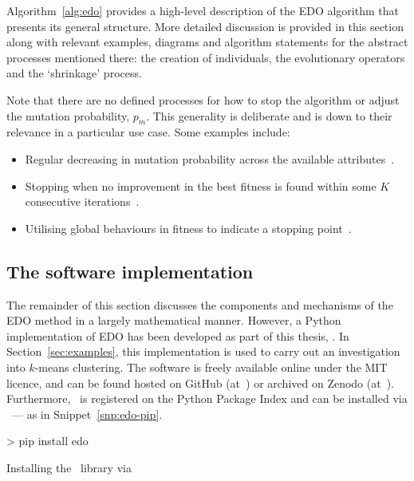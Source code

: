 Algorithm~\ref{alg:edo} provides a high-level description of the EDO algorithm
that presents its general structure. More detailed discussion is provided in
this section along with relevant examples, diagrams and algorithm statements for
the abstract processes mentioned there: the creation of individuals, the
evolutionary operators and the `shrinkage' process.


Note that there are no defined processes for how to stop the
algorithm or adjust the mutation probability, \(p_m\). This generality is
deliberate and is down to their relevance in a particular use case. Some
examples include:
\begin{itemize}
    \item Regular decreasing in mutation probability across the available
        attributes~\cite{Kuehn2013}.
    \item Stopping when no improvement in the best fitness is found within some
        \(K\) consecutive iterations~\cite{Leung2001}.
    \item Utilising global behaviours in fitness to indicate a stopping
        point~\cite{Marti2016}.
\end{itemize}


\subsection{The software implementation}

The remainder of this section discusses the components and mechanisms of the EDO
method in a largely mathematical manner. However, a Python implementation of EDO
has been developed as part of this thesis, \edo. In Section~\ref{sec:examples},
this implementation is used to carry out an investigation into \(k\)-means
clustering. The software is freely available online under the MIT licence, and
can be found hosted on GitHub (at~) or archived on
Zenodo (at~). Furthermore, \edo\ is registered on
the Python Package Index and can be installed via \pip\ --- as in
Snippet~\ref{snp:edo-pip}.

\begin{listing}[htbp]
\begin{usagesh}
> pip install edo
\end{usagesh}
\caption{Installing the \edo\ library via \pip}\label{snp:edo-pip}
\end{listing}

